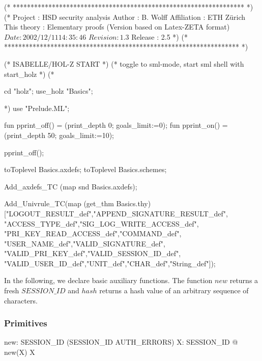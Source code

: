 \documentclass[a4paper,pdftex]{article}
\newenvironment{holz-ml}{\comment}{\endcomment}
\begin{document}
\begin{holz-ml}
(* ***************************************************************** *)
(*      Project         : HSD security analysis
        Author          : B. Wolff
        Affiliation     : ETH Z\"urich
        This theory     : Elementary proofs
                          (Version based on Latex-ZETA format)
        $Date: 2002/12/11 14:35:46 $
        $Revision: 1.3 $
        Release         : 2.5                                         *)
(* ****************************************************************** *)

(* ISABELLE/HOL-Z START *)
(* toggle to sml-mode, start sml shell with start_holz *)
(* 

cd "holz";
use_holz "Basics";

 *)
use "Prelude.ML";

fun pprint_off() = (print_depth 0; goals_limit:=0);
fun pprint_on() = (print_depth 50; goals_limit:=10);

pprint_off();

toToplevel Basics.axdefs;
toToplevel Basics.schemes;


Add_axdefs_TC (map snd Basics.axdefs); 


Add_Univrule_TC(map (get_thm Basics.thy) 
                     ["LOGOUT_RESULT_def","APPEND_SIGNATURE_RESULT_def",
                      "ACCESS_TYPE_def","SIG_LOG_WRITE_ACCESS_def",
                      "PRI_KEY_READ_ACCESS_def","COMMAND_def",
                      "USER_NAME_def","VALID_SIGNATURE_def",
                      "VALID_PRI_KEY_def","VALID_SESSION_ID_def",
                      "VALID_USER_ID_def","UNIT_def","CHAR_def","String_def"]);


\end{holz-ml}

In the following, we declare basic auxiliary functions.  The function
$new$ returns a fresh $SESSION\_ID$ and $hash$ returns a hash value of
an arbitrary sequence of characters.

\subsubsection{Primitives}
\begin{axdef}
  new: \finset SESSION\_ID \fun (SESSION\_ID \setminus AUTH\_ERRORS)
  \where
  \forall  X: \finset SESSION\_ID @ new(X) \notin X
\end{axdef}
\end{document}
